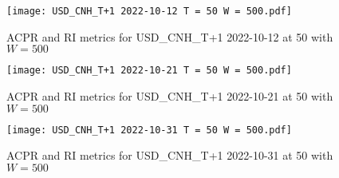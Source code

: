         \begin{figure}[htbp]
            \texttt{[image: USD\_CNH\_T+1 2022-10-12 T = 50 W = 500.pdf]}
            \caption{ACPR and RI metrics for USD\_CNH\_T+1 2022-10-12 at 50 with $W = 500$}
        \end{figure}
        
        \begin{figure}[htbp]
            \texttt{[image: USD\_CNH\_T+1 2022-10-21 T = 50 W = 500.pdf]}
            \caption{ACPR and RI metrics for USD\_CNH\_T+1 2022-10-21 at 50 with $W = 500$}
        \end{figure}
        
        \begin{figure}[htbp]
            \texttt{[image: USD\_CNH\_T+1 2022-10-31 T = 50 W = 500.pdf]}
            \caption{ACPR and RI metrics for USD\_CNH\_T+1 2022-10-31 at 50 with $W = 500$}\label{fig:backtest4}
        \end{figure}